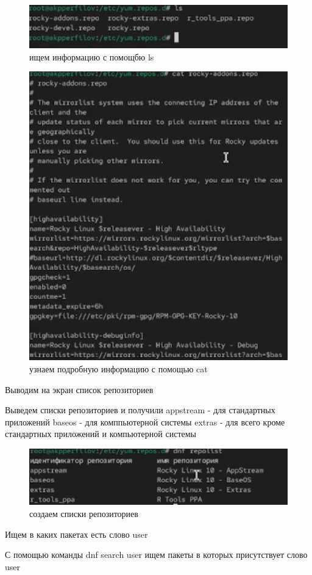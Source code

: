 \documentclass[
  english,
  russian,
  12pt,
  a4paper,
  DIV=11,
  numbers=noendperiod]{scrreprt}
\begin{document}
\begin{figure}

{\centering \includegraphics[width=0.2\linewidth,height=\textheight,keepaspectratio]{image/3.jpg}

}

\caption{ищем информацию с помощбю ls}

\end{figure}%

\begin{figure}

{\centering \includegraphics[width=0.2\linewidth,height=\textheight,keepaspectratio]{image/4.jpg}

}

\caption{узнаем подробную информацию с помощью cat}

\end{figure}%

Выводим на экран список репозиториев

Выведем списки репозиториев и получили appstream - для стандартных
приложений baseos - для комппьютерной системы extras - для всего кроме
стандартных приложений и компьютерной системы

\begin{figure}

{\centering \includegraphics[width=0.71\linewidth,height=\textheight,keepaspectratio]{image/5.jpg}

}

\caption{создаем списки репозиториев}

\end{figure}%

Ищем в каких пакетах есть слово user

С помощью команды dnf search user ищем пакеты в которых присутствует
слово user
\end{document}
